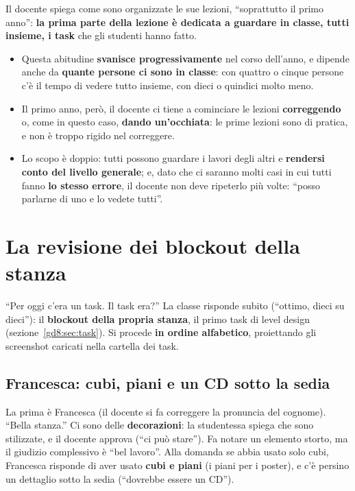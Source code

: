 Il docente spiega come sono organizzate le sue lezioni, ``soprattutto il primo
anno'': \textbf{la prima parte della lezione è dedicata a guardare in classe,
tutti insieme, i task} che gli studenti hanno fatto.
\begin{itemize}
  \item Questa abitudine \textbf{svanisce progressivamente} nel corso
        dell'anno, e dipende anche da \textbf{quante persone ci sono in
        classe}: con quattro o cinque persone c'è il tempo di vedere tutto
        insieme, con dieci o quindici molto meno.
  \item Il primo anno, però, il docente ci tiene a cominciare le lezioni
        \textbf{correggendo} o, come in questo caso, \textbf{dando
        un'occhiata}: le prime lezioni sono di pratica, e non è troppo
        rigido nel correggere.
  \item Lo scopo è doppio: tutti possono guardare i lavori degli altri e
        \textbf{rendersi conto del livello generale}; e, dato che ci saranno
        molti casi in cui tutti fanno \textbf{lo stesso errore}, il docente
        non deve ripeterlo più volte: ``posso parlarne di uno e lo vedete
        tutti''.
\end{itemize}

\section{La revisione dei blockout della stanza}
\label{gd11:sec:revisione}

``Per oggi c'era un task. Il task era?'' La classe risponde subito (``ottimo,
dieci su dieci''): il \textbf{blockout della propria stanza}, il primo task di
level design (sezione~\ref{gd8:sec:task}). Si procede \textbf{in ordine
alfabetico}, proiettando gli screenshot caricati nella cartella dei task.

\subsection{Francesca: cubi, piani e un CD sotto la sedia}

La prima è Francesca (il docente si fa correggere la pronuncia del cognome).
``Bella stanza.'' Ci sono delle \textbf{decorazioni}: la studentessa spiega che
sono stilizzate, e il docente approva (``ci può stare''). Fa notare un
elemento storto, ma il giudizio complessivo è ``bel lavoro''. Alla domanda se
abbia usato solo cubi, Francesca risponde di aver usato \textbf{cubi e piani}
(i piani per i poster), e c'è persino un dettaglio sotto la sedia (``dovrebbe
essere un CD'').

